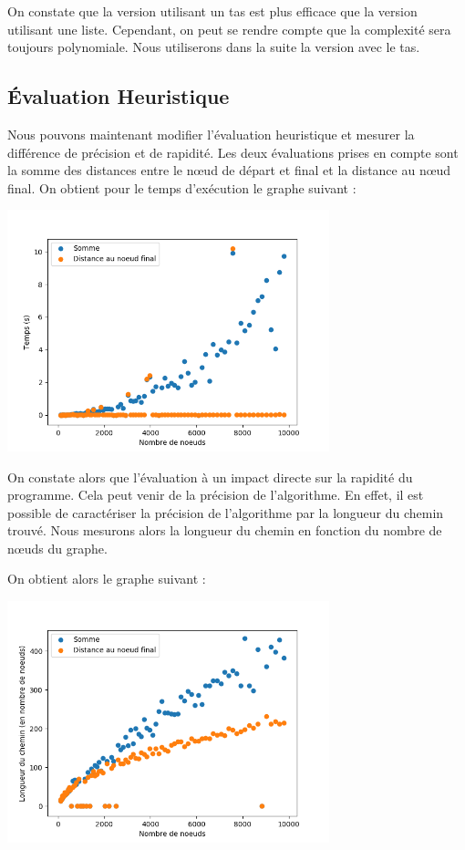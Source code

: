 On constate que la version utilisant un tas est plus efficace que la version utilisant une liste. 
Cependant, on peut se rendre compte que la complexité sera toujours polynomiale.
Nous utiliserons dans la suite la version avec le tas.

\subsection{Évaluation Heuristique}

Nous pouvons maintenant modifier l’évaluation heuristique et mesurer la différence de précision et de rapidité. 
Les deux évaluations prises en compte sont la somme des distances entre le nœud de départ et final et la distance au nœud final. 
On obtient pour le temps d’exécution le graphe suivant :

\begin{center}
    \includegraphics[height=7cm]{2.png}
\end{center}

On constate alors que l’évaluation à un impact directe sur la rapidité du programme. Cela peut venir de 
la précision de l’algorithme. En effet, il est possible de caractériser la précision de l’algorithme par la longueur du chemin trouvé. 
Nous mesurons alors la longueur du chemin en fonction du nombre de nœuds du graphe. 

On obtient alors le graphe suivant :

\begin{center}
    \includegraphics[height=7cm]{3.png}
\end{center}

